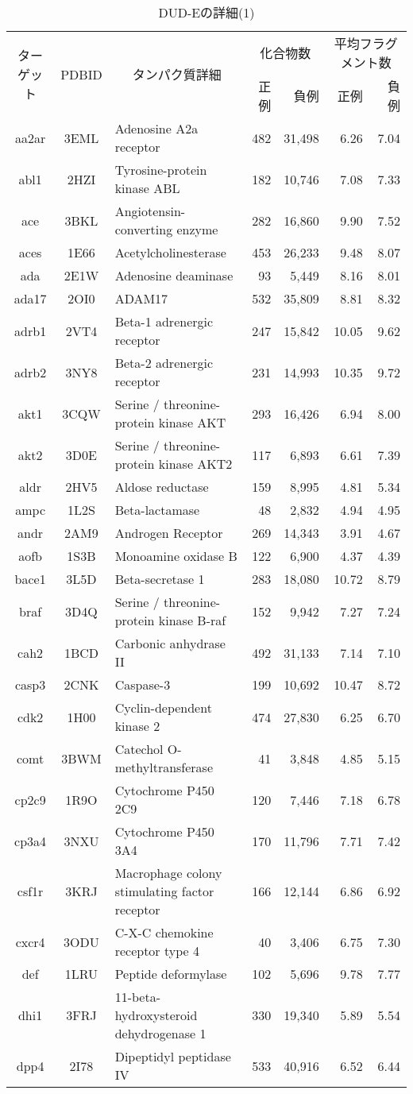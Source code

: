 \begin{table}[t] \centering
	\caption{DUD-Eの詳細(1)}
	\label{tb:dude_description:1}
	\begin{tabular}{c|c|p{6cm}|rr|rr}
	\hline
	\multirow{2}{*}{ターゲット}	&\multirow{2}{*}{PDBID}	&\multicolumn{1}{c|}{\multirow{2}{*}{タンパク質詳細}}	&\multicolumn{2}{c|}{化合物数}	&\multicolumn{2}{c}{平均フラグメント数}		\\
							&					&											&正例	&負例				&正例	&負例						\\ \hline
aa2ar&3EML&Adenosine A2a receptor&482&31,498&6.26&7.04 \\
abl1&2HZI&Tyrosine-protein kinase ABL&182&10,746&7.08&7.33 \\
ace&3BKL&Angiotensin-converting enzyme&282&16,860&9.90&7.52 \\
aces&1E66&Acetylcholinesterase&453&26,233&9.48&8.07 \\
ada&2E1W&Adenosine deaminase&93&5,449&8.16&8.01 \\
ada17&2OI0&ADAM17&532&35,809&8.81&8.32 \\
adrb1&2VT4&Beta-1 adrenergic receptor&247&15,842&10.05&9.62 \\
adrb2&3NY8&Beta-2 adrenergic receptor&231&14,993&10.35&9.72 \\
akt1&3CQW&Serine / threonine-protein kinase AKT&293&16,426&6.94&8.00 \\
akt2&3D0E&Serine / threonine-protein kinase AKT2&117&6,893&6.61&7.39 \\
aldr&2HV5&Aldose reductase&159&8,995&4.81&5.34 \\
ampc&1L2S&Beta-lactamase&48&2,832&4.94&4.95 \\
andr&2AM9&Androgen Receptor&269&14,343&3.91&4.67 \\
aofb&1S3B&Monoamine oxidase B&122&6,900&4.37&4.39 \\
bace1&3L5D&Beta-secretase 1&283&18,080&10.72&8.79 \\
braf&3D4Q&Serine / threonine-protein kinase B-raf&152&9,942&7.27&7.24 \\
cah2&1BCD&Carbonic anhydrase II&492&31,133&7.14&7.10 \\
casp3&2CNK&Caspase-3&199&10,692&10.47&8.72 \\
cdk2&1H00&Cyclin-dependent kinase 2&474&27,830&6.25&6.70 \\
comt&3BWM&Catechol O-methyltransferase&41&3,848&4.85&5.15 \\
cp2c9&1R9O&Cytochrome P450 2C9&120&7,446&7.18&6.78 \\
cp3a4&3NXU&Cytochrome P450 3A4&170&11,796&7.71&7.42 \\
csf1r&3KRJ&Macrophage colony stimulating factor receptor&166&12,144&6.86&6.92 \\
cxcr4&3ODU&C-X-C chemokine receptor type 4&40&3,406&6.75&7.30 \\
def&1LRU&Peptide deformylase&102&5,696&9.78&7.77 \\
dhi1&3FRJ&11-beta-hydroxysteroid dehydrogenase 1&330&19,340&5.89&5.54 \\ 
dpp4&2I78&Dipeptidyl peptidase IV&533&40,916&6.52&6.44 \\
\hline
	\end{tabular}
\end{table}
